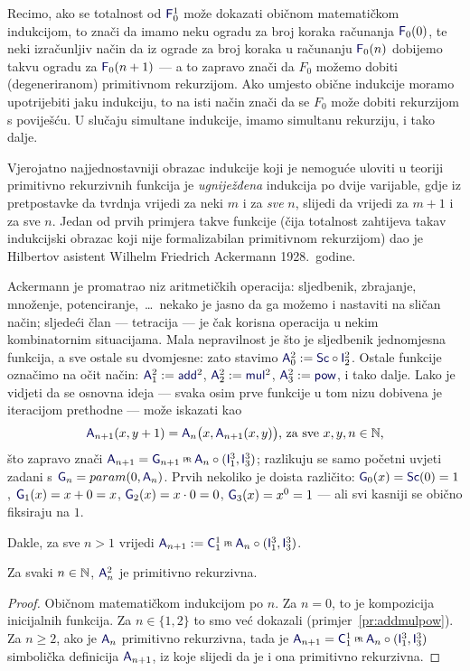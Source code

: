 Recimo, ako se totalnost od $\f F_0^1$ može dokazati običnom matematičkom indukcijom, to znači da imamo neku ogradu za broj koraka računanja $\f F_0(0)$, te neki izračunljiv način da iz ograde za broj koraka u računanju $\f F_0(n)$ dobijemo takvu ogradu za $\f F_0(n+1)$ --- a to zapravo znači da $F_0$ možemo dobiti (degeneriranom) primitivnom rekurzijom. Ako umjesto obične indukcije moramo upotrijebiti jaku indukciju, to na isti način znači da se $F_0$ može dobiti rekurzijom s poviješću. U slučaju simultane indukcije, imamo simultanu rekurziju, i tako dalje.

Vjerojatno najjednostavniji obrazac indukcije koji je nemoguće uloviti u teoriji primitivno rekurzivnih funkcija je \emph{ugniježđena} indukcija po dvije varijable, gdje iz pretpostavke da tvrdnja vrijedi za neki $m$ i za \emph{sve} $n$, slijedi da vrijedi za $m+1$ i za sve $n$. Jedan od prvih primjera takve funkcije (čija totalnost zahtijeva takav indukcijski obrazac koji nije formalizabilan primitivnom rekurzijom) dao je Hilbertov asistent Wilhelm Friedrich Ackermann 1928.\ godine.

Ackermann je promatrao niz aritmetičkih operacija: sljedbenik, zbrajanje, množenje, potenciranje,~\ldots\ nekako je jasno da ga možemo i nastaviti na sličan način; sljedeći član --- tetracija --- je čak korisna operacija u nekim kombinatornim situacijama. Mala nepravilnost je što je sljedbenik jednomjesna funkcija, a sve ostale su dvomjesne: zato stavimo $\f A_0^2:=\f{Sc}\circ \f I_2^2$. Ostale funkcije označimo na očit način: $\f A_1^2:=\f{add}^2$, $\f A_2^2:=\f{mul}^2$, $\f A_3^2:=\f{pow}$, i tako dalje. Lako je vidjeti da se osnovna ideja --- svaka osim prve funkcije u tom nizu dobivena je iteracijom prethodne --- može iskazati kao
\begin{equation}\label{eq:A2SSdef}
    \f A_{n+1}(x,y+1)=\f A_n\bigl(x,\f A_{n+1}(x,y)\bigr)\text{, za sve }x,y,n\in\N\text,
\end{equation}
što zapravo znači $\f A_{n+1}=\f G_{n+1}\pr\f A_n\circ(\f I_1^3,\f I_3^3)$; razlikuju se samo početni uvjeti zadani s $\f G_n=param(0,\f A_n)$. Prvih nekoliko je doista različito: $\f G_0(x)=\f{Sc}(0)=1$, $\f G_1(x)=x+0=x$, $\f G_2(x)=x\cdot 0=0$, $\f G_3(x)=x^0=1$ --- ali svi kasniji se obično fiksiraju na $1$.

Dakle, za sve $n>1$ vrijedi $\f A_{n+1}:=\f C_1^1\pr\f A_n\circ(\f I_1^3,\f I_3^3)$.

\begin{propozicija}\label{pp:Anprn}
    Za svaki $n\in{\mathbb N}$, $\f A_n^2$ je primitivno rekurzivna.
\end{propozicija}
\begin{proof}
Običnom matematičkom indukcijom po $n$. Za $n=0$, to je kompozicija inicijalnih funkcija. Za $n\in\{1,2\}$ to smo već dokazali (primjer~\ref{pr:addmulpow}). Za $n\ge 2$, ako je $\f A_n$ primitivno rekurzivna, tada je $\f A_{n+1}=\f C_1^1\pr\f A_n\circ(\f I_1^3,\f I_3^3)$ simbolička definicija $\f A_{n+1}$, iz koje slijedi da je i ona primitivno rekurzivna.
\end{proof}

